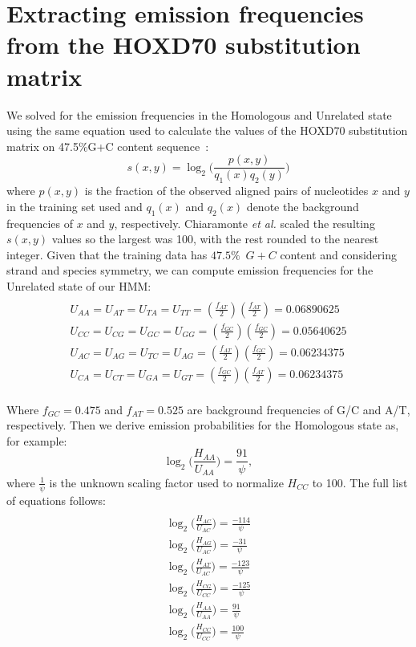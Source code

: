 \documentclass[9.5pt,journal,final,finalsubmission,twocolumn]{IEEEtran}
\begin{document}
\section{Extracting emission frequencies from the HOXD70 substitution matrix}
We solved for the emission frequencies in the
Homologous and Unrelated state using the same equation used to
calculate the values of the HOXD70 substitution matrix on 47.5\%G+C
content sequence~\cite{hoxd}:
\begin{equation}
s(x,y)= \log_{2}{\Bigg(\frac{p(x,y)}{q_{1}(x)q_{2}(y)}\Bigg)}
\end{equation}
{w}here $p(x,y)$ is the fraction of the observed aligned pairs of
nucleotides $x$ and $y$ in the training set used and $q_{1}(x)$ and
$q_{2}(x)$ denote the background frequencies of $x$ and $y$,
respectively. Chiaramonte \textit{et al.} scaled the resulting
$s(x,y)$ values so the largest was 100,
with the rest rounded to the nearest integer.  Given that the training
data has $47.5\%$~$G+C$ content and considering strand and species
symmetry, we can compute emission frequencies for the Unrelated state
of our HMM:
\begin{multline}\\
U_{AA}=U_{AT}=U_{TA}=U_{TT}=(\frac{f_{AT}}{2})(\frac{f_{AT}}{2})
= 0.06890625 \\
U_{CC}=U_{CG}=U_{GC}=U_{GG}=(\frac{f_{GC}}{2})(\frac{f_{GC}}{2}) =
0.05640625 \\
U_{AC}=U_{AG}=U_{TC}=U_{AG}=(\frac{f_{AT}}{2})(\frac{f_{GC}}{2}) =
0.06234375 \\
U_{CA}=U_{CT}=U_{GA}=U_{GT}=(\frac{f_{GC}}{2})(\frac{f_{AT}}{2}) =
0.06234375 \\
\end{multline}

Where $f_{GC}=0.475$ and $f_{AT}=0.525$ are background frequencies of
G/C and A/T, respectively.  Then we derive emission probabilities for
the Homologous state as, for example:
\begin{equation}
\log_{2}\bigg(\frac{H_{AA}}{U_{AA}}\bigg) = \frac{91}{\psi},
\end{equation}
where $\frac{1}{\psi}$ is the unknown scaling factor used to normalize $H_{CC}$ to 100. The full list of equations follows:
\begin{multline}\\
\log_{2}\bigg(\frac{H_{AC}}{U_{AC}}\bigg) = \frac{-114}{\psi}\\
\log_{2}\bigg(\frac{H_{AG}}{U_{AC}}\bigg) = \frac{-31}{\psi}\\
\log_{2}\bigg(\frac{H_{AT}}{U_{AC}}\bigg) = \frac{-123}{\psi}\\
\log_{2}\bigg(\frac{H_{CG}}{U_{CC}}\bigg) = \frac{-125}{\psi}\\
\log_{2}\bigg(\frac{H_{AA}}{U_{AA}}\bigg) = \frac{91}{\psi}\\
\log_{2}\bigg(\frac{H_{CC}}{U_{CC}}\bigg) = \frac{100}{\psi}\\
\end{multline}
\end{document}
